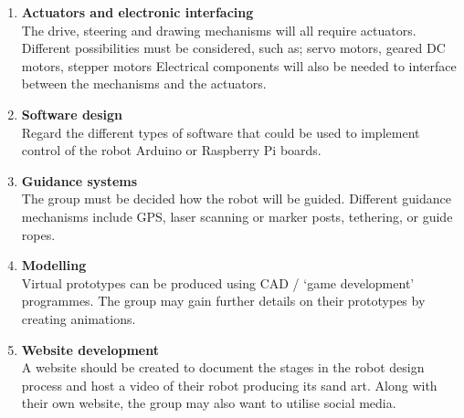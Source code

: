 \begin{enumerate}
        \item \textbf{Actuators and electronic interfacing}\\
        The drive, steering and drawing mechanisms will all require actuators. Different possibilities must be considered, such as; servo motors, geared DC motors, stepper motors \etc
        Electrical components will also be needed to interface between the mechanisms and the actuators.

        \item \textbf{Software design}\\
        Regard the different types of software that could be used to implement control of the robot \ie Arduino or Raspberry Pi boards.

        \item\textbf{Guidance systems}\\
        The group must be decided how the robot will be guided. Different guidance mechanisms include GPS, laser scanning or marker posts, tethering, or guide ropes.

        \item\textbf{Modelling}\\
        Virtual prototypes can be produced using CAD / `game development' programmes. The group may gain further details on their prototypes by creating animations.

        \item\textbf{Website development}\\
        A website should be created to document the stages in the robot design process and host a video of their robot producing its sand art. Along with their own website, the group may also want to utilise social media.
    \end{enumerate}

